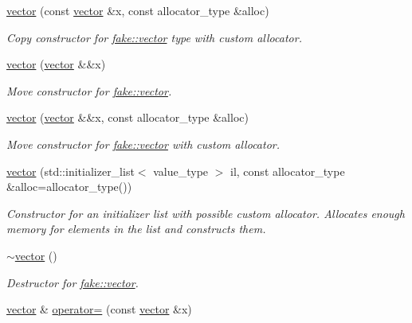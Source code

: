 \begin{DoxyCompactItemize}
\mbox{\hyperlink{classfake_1_1vector_a4d84ce09550fabd1fce9335f9de714c6}{vector}} (const \mbox{\hyperlink{classfake_1_1vector}{vector}} \&x, const allocator\+\_\+type \&alloc)
\begin{DoxyCompactList}\small\item\em Copy constructor for \mbox{\hyperlink{classfake_1_1vector}{fake\+::vector}} type with custom allocator. \end{DoxyCompactList}\item 
\mbox{\hyperlink{classfake_1_1vector_aae815b5ce700b2b1a816dd26351ba77f}{vector}} (\mbox{\hyperlink{classfake_1_1vector}{vector}} \&\&x)
\begin{DoxyCompactList}\small\item\em Move constructor for \mbox{\hyperlink{classfake_1_1vector}{fake\+::vector}}. \end{DoxyCompactList}\item 
\mbox{\hyperlink{classfake_1_1vector_ae0022ef48098e201c22cddbde25a8be7}{vector}} (\mbox{\hyperlink{classfake_1_1vector}{vector}} \&\&x, const allocator\+\_\+type \&alloc)
\begin{DoxyCompactList}\small\item\em Move constructor for \mbox{\hyperlink{classfake_1_1vector}{fake\+::vector}} with custom allocator. \end{DoxyCompactList}\item 
\mbox{\hyperlink{classfake_1_1vector_a105d76ee97b7b28f47a5ff953d3938b1}{vector}} (std\+::initializer\+\_\+list$<$ value\+\_\+type $>$ il, const allocator\+\_\+type \&alloc=allocator\+\_\+type())
\begin{DoxyCompactList}\small\item\em Constructor for an initializer list with possible custom allocator. Allocates enough memory for elements in the list and constructs them. \end{DoxyCompactList}\item 
\mbox{\label{classfake_1_1vector_a2324daef35048187cd9552811756a86c}} 
\mbox{\hyperlink{classfake_1_1vector_a2324daef35048187cd9552811756a86c}{$\sim$vector}} ()
\begin{DoxyCompactList}\small\item\em Destructor for \mbox{\hyperlink{classfake_1_1vector}{fake\+::vector}}. \end{DoxyCompactList}\item 
\mbox{\hyperlink{classfake_1_1vector}{vector}} \& \mbox{\hyperlink{classfake_1_1vector_a3ae5339e17ed0f558b0b94009b45c3c1}{operator=}} (const \mbox{\hyperlink{classfake_1_1vector}{vector}} \&x)

\end{DoxyCompactItemize}
